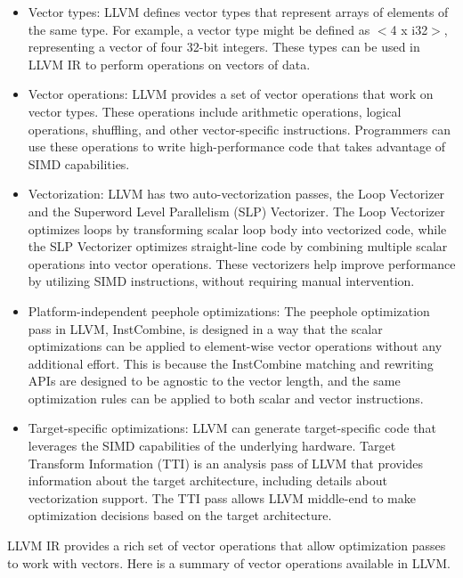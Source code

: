 \begin{itemize}

\item Vector types: LLVM defines vector types that represent arrays of
  elements of the same type. For example, a vector type might be
  defined as $<$4 x i32$>$, representing a vector of four 32-bit integers.
  These types can be used in LLVM IR to perform operations on vectors
  of data.

\item Vector operations: LLVM provides a set of vector operations that
  work on vector types. These operations include arithmetic operations,
  logical operations, shuffling, and other vector-specific
  instructions. Programmers can use these operations to write
  high-performance code that takes advantage of SIMD capabilities.

\item Vectorization: LLVM has two auto-vectorization passes, the
  Loop Vectorizer and the Superword Level Parallelism (SLP)
  Vectorizer.
  The Loop Vectorizer optimizes loops by transforming scalar loop body
  into vectorized code, while the SLP Vectorizer optimizes
  straight-line code by combining multiple scalar operations into
  vector operations.
  These vectorizers help improve performance by utilizing SIMD
  instructions, without requiring manual intervention.

\item Platform-independent peephole optimizations: The peephole
  optimization pass in LLVM, InstCombine, is designed in a way that
  the scalar optimizations can be applied to element-wise vector
  operations without any additional effort.
  This is because the InstCombine matching and rewriting APIs are
  designed to be agnostic to the vector length, and the same
  optimization rules can be applied to both scalar and vector
  instructions.

\item Target-specific optimizations: LLVM can generate target-specific
  code that leverages the SIMD capabilities of the underlying
  hardware.
  Target Transform Information (TTI) is an analysis pass of LLVM that
  provides information about the target architecture, including
  details about vectorization support.
  The TTI pass allows LLVM middle-end to make optimization decisions
  based on the target architecture.


\end{itemize}

LLVM IR provides a rich set of vector operations that allow
optimization passes to work with vectors. Here is a summary of vector
operations available in LLVM.

